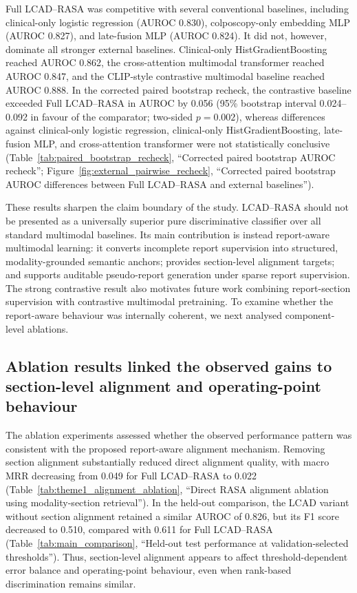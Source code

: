 Full LCAD--RASA was competitive with several conventional baselines, including clinical-only logistic regression (AUROC 0.830), colposcopy-only embedding MLP (AUROC 0.827), and late-fusion MLP (AUROC 0.824). It did not, however, dominate all stronger external baselines. Clinical-only HistGradientBoosting reached AUROC 0.862, the cross-attention multimodal transformer reached AUROC 0.847, and the CLIP-style contrastive multimodal baseline reached AUROC 0.888. In the corrected paired bootstrap recheck, the contrastive baseline exceeded Full LCAD--RASA in AUROC by 0.056 (95\% bootstrap interval 0.024--0.092 in favour of the comparator; two-sided $p=0.002$), whereas differences against clinical-only logistic regression, clinical-only HistGradientBoosting, late-fusion MLP, and cross-attention transformer were not statistically conclusive (Table~\ref{tab:paired_bootstrap_recheck}, ``Corrected paired bootstrap AUROC recheck''; Figure~\ref{fig:external_pairwise_recheck}, ``Corrected paired bootstrap AUROC differences between Full LCAD--RASA and external baselines'').

These results sharpen the claim boundary of the study. LCAD--RASA should not be presented as a universally superior pure discriminative classifier over all standard multimodal baselines. Its main contribution is instead report-aware multimodal learning: it converts incomplete report supervision into structured, modality-grounded semantic anchors; provides section-level alignment targets; and supports auditable pseudo-report generation under sparse report supervision. The strong contrastive result also motivates future work combining report-section supervision with contrastive multimodal pretraining. To examine whether the report-aware behaviour was internally coherent, we next analysed component-level ablations.

\subsection{Ablation results linked the observed gains to section-level alignment and operating-point behaviour}
\label{subsec:ablation_results}

The ablation experiments assessed whether the observed performance pattern was consistent with the proposed report-aware alignment mechanism. Removing section alignment substantially reduced direct alignment quality, with macro MRR decreasing from 0.049 for Full LCAD--RASA to 0.022 (Table~\ref{tab:theme1_alignment_ablation}, ``Direct RASA alignment ablation using modality-section retrieval''). In the held-out comparison, the LCAD variant without section alignment retained a similar AUROC of 0.826, but its F1 score decreased to 0.510, compared with 0.611 for Full LCAD--RASA (Table~\ref{tab:main_comparison}, ``Held-out test performance at validation-selected thresholds''). Thus, section-level alignment appears to affect threshold-dependent error balance and operating-point behaviour, even when rank-based discrimination remains similar.

